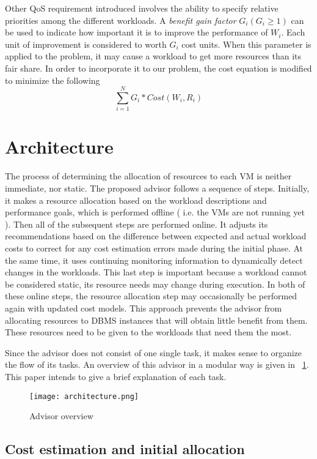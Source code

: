 Other QoS requirement introduced involves the ability to specify relative priorities among the different workloads. A \textit{benefit gain factor} $G_{i} (G_{i} \geq 1)$ can be used to indicate how important it is to improve the performance of $W_{i}$. Each unit of improvement is considered to worth $G_{i}$ cost units. When this parameter is applied to the problem, it may cause a workload to get more resources than its fair share. In order to incorporate it to our problem, the cost equation is modified to minimize the following
\[
  \sum_{i=1}^{N} G_{i} * Cost(W_{i},R_{i})
\]


\section{Architecture}

The process of  determining the allocation of resources to each VM is neither immediate, nor static. The proposed advisor follows a sequence of steps. Initially, it makes a resource allocation based on the workload descriptions and performance goals, which is performed offline ( i.e. the VMs are not running yet ). Then all of the subsequent steps are performed online. It adjusts its recommendations based on the difference between expected and actual workload costs to correct for any cost estimation errors made during the initial phase. At the same time, it uses continuing monitoring information to dynamically detect changes in the workloads. This last step is important because a workload cannot be considered static, its resource needs may change during execution. In both of these online steps, the resource allocation step may occasionally be performed again with updated cost models. This approach prevents the advisor from allocating resources to DBMS instances that will obtain little benefit from them. These 
resources need to be given to the workloads that need them the most.

Since the advisor does not consist of one single task, it makes sense to organize the flow of its tasks. An overview of this advisor in a modular way is given in ~\ref{fig:architecture}. This paper intends to give a brief explanation of each task.


\begin{figure}[ht]
\centering
\texttt{[image: architecture.png]}
\caption{Advisor overview}
\label{fig:architecture}
\end{figure} 

\subsection{Cost estimation and initial allocation}

